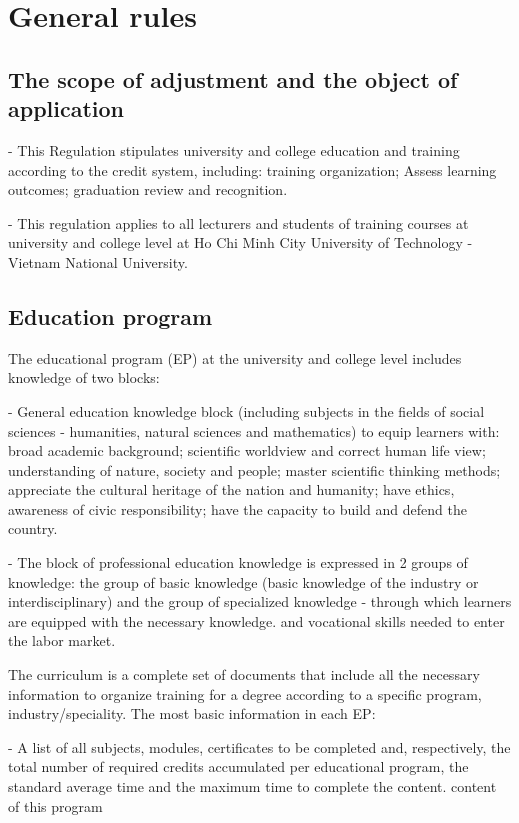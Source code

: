 \chapter{General rules}
\section{The scope of adjustment and the object of application}

- This Regulation stipulates university and college education and training according to the credit system, including: training organization; Assess learning outcomes; graduation review and recognition.

- This regulation applies to all lecturers and students of training courses at university and college level at Ho Chi Minh City University of Technology - Vietnam National University.

\section{Education program}
The educational program (EP) at the university and college level includes knowledge of two blocks:

- General education knowledge block (including subjects in the fields of social sciences - humanities, natural sciences and mathematics) to equip learners with: broad academic background; scientific worldview and correct human life view; understanding of nature, society and people; master scientific thinking methods; appreciate the cultural heritage of the nation and humanity; have ethics, awareness of civic responsibility; have the capacity to build and defend the country.

- The block of professional education knowledge is expressed in 2 groups of knowledge: the group of basic knowledge (basic knowledge of the industry or interdisciplinary) and the group of specialized knowledge - through which learners are equipped with the necessary knowledge. and vocational skills needed to enter the labor market.

The curriculum is a complete set of documents that include all the necessary information to organize training for a degree according to a specific program, industry/speciality. The most basic information in each EP:

- A list of all subjects, modules, certificates to be completed and, respectively, the total number of required credits accumulated per educational program, the standard average time and the maximum time to complete the content. content of this program

